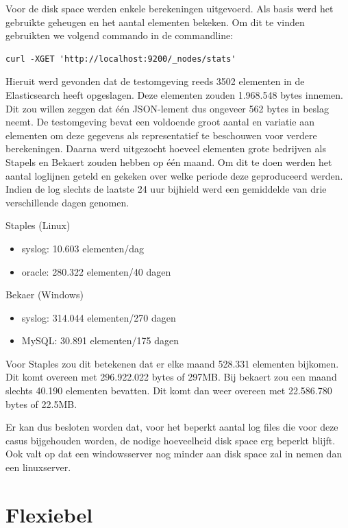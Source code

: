 Voor de disk space werden enkele berekeningen uitgevoerd. Als basis werd het gebruikte geheugen en het aantal elementen bekeken. Om dit te vinden gebruikten we volgend commando in de commandline:
\lstset{escapechar=@,style=customc}        
\begin{lstlisting}[frame=single]  
	curl -XGET 'http://localhost:9200/_nodes/stats'
\end{lstlisting}
Hieruit werd gevonden dat de testomgeving reeds 3502 elementen in de Elasticsearch heeft opgeslagen. Deze elementen zouden 1.968.548 bytes innemen.
Dit zou willen zeggen dat één JSON-lement dus ongeveer 562 bytes in beslag neemt.
De testomgeving bevat een voldoende groot aantal en variatie aan elementen om deze gegevens als representatief te beschouwen voor verdere berekeningen.
Daarna werd uitgezocht hoeveel elementen grote bedrijven als Stapels en Bekaert zouden hebben op één maand. Om dit te doen werden het aantal loglijnen geteld en gekeken over welke periode deze geproduceerd werden.
Indien de log slechts de laatste 24 uur bijhield werd een gemiddelde van drie verschillende dagen genomen. 

Staples (Linux)
\begin{itemize}
	\item syslog:  10.603 elementen/dag
	\item oracle: 280.322 elementen/40 dagen
\end{itemize}	

Bekaer (Windows)
\begin{itemize}
	\item syslog: 314.044 elementen/270 dagen
	\item MySQL:   30.891 elementen/175 dagen
\end{itemize}

Voor Staples zou dit betekenen dat er elke maand 528.331 elementen bijkomen. Dit komt overeen met 296.922.022 bytes of 297MB.
Bij bekaert zou een maand slechts 40.190 elementen bevatten. Dit komt dan weer overeen met 22.586.780 bytes of 22.5MB.

Er kan dus besloten worden dat, voor het beperkt aantal log files die voor deze casus bijgehouden worden, de nodige hoeveelheid disk space erg beperkt blijft. 
Ook valt op dat een windowsserver nog minder aan disk space zal in nemen dan een linuxserver.

\section{Flexiebel}
\label{sec:flexiebel}

